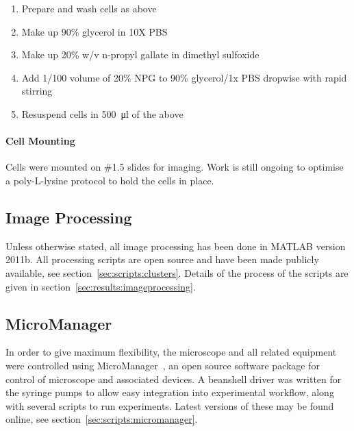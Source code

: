 \documentclass[../main.tex]{subfiles}
\begin{document}
\begin{enumerate}
\item Prepare and wash cells as above
\item Make up 90\% glycerol in 10X PBS
\item Make up 20\% w/v n-propyl gallate in dimethyl sulfoxide
\item Add 1/100 volume of 20\% NPG to 90\% glycerol/1x PBS dropwise with rapid stirring
\item Resuspend cells in \SI{500}{\micro\litre} of the above
\end{enumerate}

\paragraph{Cell Mounting} Cells were mounted on \#1.5 slides for imaging. Work is still ongoing to optimise a poly-L-lysine protocol to hold the cells in place.


\subsection{Image Processing}
\label{sec:method:imageproc}
Unless otherwise stated, all image processing has been done in MATLAB version 2011b. All processing scripts are open source and have been made publicly available, see section~\ref{sec:scripts:clusters}. Details of the process of the scripts are given in section~\ref{sec:results:imageprocessing}.

\subsection{MicroManager}

In order to give maximum flexibility, the microscope and all related equipment were controlled using MicroManager~\citep{micromanager}, an open source software package for control of microscope and associated devices. A beanshell driver was written for the syringe pumps to allow easy integration into experimental workflow, along with several scripts to run experiments. Latest versions of these may be found online, see section~\ref{sec:scripts:micromanager}.
\end{document}
